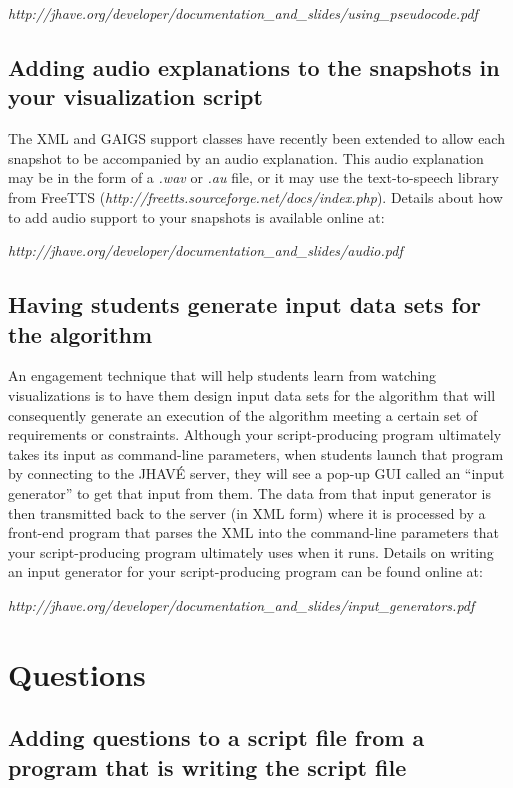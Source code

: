 \documentclass[11pt,letterpaper]{book}
\begin{document}
\textit{http://jhave.org/developer/documentation\_and\_slides/using\_pseudocode.pdf}

\section{Adding audio explanations to the snapshots in your visualization script}
\label{audio-support}

The XML and GAIGS support classes have recently been extended to allow
each snapshot to be accompanied by an audio explanation.  This audio
explanation may be in the form of a \textit{.wav} or \textit{.au}
file, or it may use the text-to-speech library from FreeTTS
(\textit{http://freetts.sourceforge.net/docs/index.php}).  Details
about how to add audio support to your snapshots is available online
at:

\textit{http://jhave.org/developer/documentation\_and\_slides/audio.pdf}


\section{Having students generate input data sets for the algorithm}
\label{input-generators}

An engagement technique that will help students learn from watching
visualizations is to have them design input data sets for the
algorithm that will consequently generate an execution of the
algorithm meeting a certain set of requirements or constraints.
Although your script-producing program ultimately takes its input as
command-line parameters, when students launch that program by
connecting to the JHAV\'{E} server, they will see a pop-up GUI called
an ``input generator'' to get that input from them.  The data from
that input generator is then transmitted back to the server (in XML
form) where it is processed by a front-end program that parses the XML
into the command-line parameters that your script-producing program
ultimately uses when it runs.  Details on writing an input generator
for your script-producing program can be found online at:

\textit{http://jhave.org/developer/documentation\_and\_slides/input\_generators.pdf}

\chapter{Questions}
\section{Adding questions to a script file from a program that is writing the script file}
\end{document}
